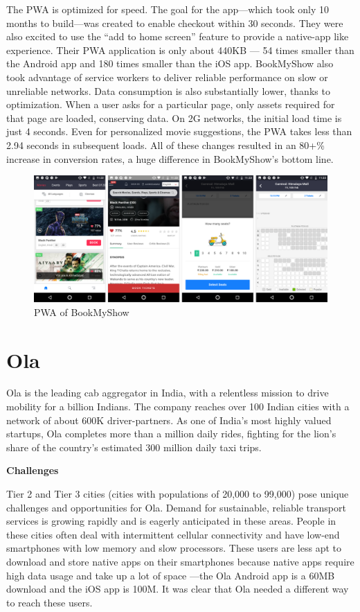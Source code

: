 \documentclass[14pt,a4paper,final]{extreport}
\begin{document}
The PWA is optimized for speed. The goal for the app—which took only 10 months to build—was created to enable checkout within 30 seconds. They were also excited to use the “add to home screen” feature to provide a native-app like experience. Their PWA application is only about 440KB — 54 times smaller than the Android app and 180 times smaller than the iOS app. BookMyShow also took advantage of service workers to deliver reliable performance on slow or unreliable networks. Data consumption is also substantially lower, thanks to optimization. When a user asks for a particular page, only assets required for that page are loaded, conserving data. On 2G networks, the initial load time is just 4 seconds. Even for personalized movie suggestions, the PWA takes less than 2.94 seconds in subsequent loads. All of these changes resulted in an 80+\% increase in conversion rates, a huge difference in BookMyShow’s bottom line.
\begin{figure}[h!]
        \centering
		\includegraphics[scale=.35]{ss5.png}
		\caption{PWA of BookMyShow}
\end{figure}
\newpage
\section{Ola}
\item Ola is the leading cab aggregator in India, with a relentless mission to drive mobility for a billion Indians. The company reaches over 100 Indian cities with a network of about 600K driver-partners. As one of India’s most highly valued startups, Ola completes more than a million daily rides, fighting for the lion’s share of the country’s estimated 300 million daily taxi trips.
\item \textbf{Challenges}

Tier 2 and Tier 3 cities (cities with populations of 20,000 to 99,000) pose unique challenges and opportunities for Ola. Demand for sustainable, reliable transport services is growing rapidly and is eagerly anticipated in these areas. People in these cities often deal with intermittent cellular connectivity and have low-end smartphones with low memory and slow processors. These users are less apt to download and store native apps on their smartphones because native apps require high data usage and take up a lot of space —the Ola Android app is a 60MB download and the iOS app is 100M. It was clear that Ola needed a different way to reach these users.
\end{document}
